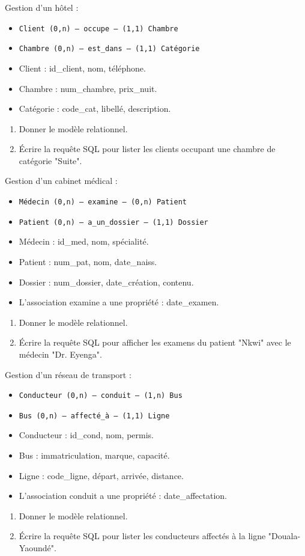 \exo{}
Gestion d'un hôtel :
\begin{itemize}
    \item \texttt{Client (0,n) --- occupe --- (1,1) Chambre}
    \item \texttt{Chambre (0,n) --- est\_dans --- (1,1) Catégorie}
    \item Client : id\_client, nom, téléphone.
    \item Chambre : num\_chambre, prix\_nuit.
    \item Catégorie : code\_cat, libellé, description.
\end{itemize}
\begin{enumerate}
    \item Donner le modèle relationnel.
    \item Écrire la requête SQL pour lister les clients occupant une chambre de catégorie "Suite".
\end{enumerate}

\exo{}
Gestion d'un cabinet médical :
\begin{itemize}
    \item \texttt{Médecin (0,n) --- examine --- (0,n) Patient}
    \item \texttt{Patient (0,n) --- a\_un\_dossier --- (1,1) Dossier}
    \item Médecin : id\_med, nom, spécialité.
    \item Patient : num\_pat, nom, date\_naiss.
    \item Dossier : num\_dossier, date\_création, contenu.
    \item L'association examine a une propriété : date\_examen.
\end{itemize}
\begin{enumerate}
    \item Donner le modèle relationnel.
    \item Écrire la requête SQL pour afficher les examens du patient "Nkwi" avec le médecin "Dr. Eyenga".
\end{enumerate}

\exo{}
Gestion d'un réseau de transport :
\begin{itemize}
    \item \texttt{Conducteur (0,n) --- conduit --- (1,n) Bus}
    \item \texttt{Bus (0,n) --- affecté\_à --- (1,1) Ligne}
    \item Conducteur : id\_cond, nom, permis.
    \item Bus : immatriculation, marque, capacité.
    \item Ligne : code\_ligne, départ, arrivée, distance.
    \item L'association conduit a une propriété : date\_affectation.
\end{itemize}
\begin{enumerate}
    \item Donner le modèle relationnel.
    \item Écrire la requête SQL pour lister les conducteurs affectés à la ligne "Douala-Yaoundé".
\end{enumerate}

